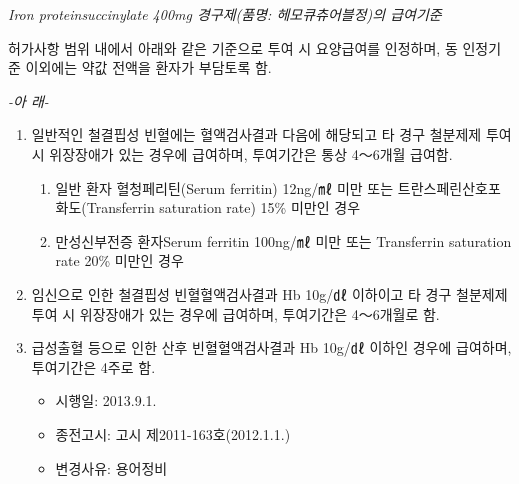 \begin{commentbox}{}
\emph{Iron proteinsuccinylate 400mg 경구제(품명: 헤모큐츄어블정)의 급여기준}\par
허가사항 범위 내에서 아래와 같은 기준으로 투여 시 요양급여를 인정하며, 동 인정기준 이외에는 약값 전액을 환자가 부담토록 함.\par
\begin{center}\emph{-아 래-}\end{center}
\begin{enumerate}[가)]\tightlist
\item 일반적인 철결핍성 빈혈에는 혈액검사결과 다음에 해당되고 타 경구 철분제제 투여 시 위장장애가 있는 경우에 급여하며, 투여기간은 통상 4～6개월 급여함.
	\begin{enumerate}[1)]\tightlist
	\item 일반 환자 혈청페리틴(Serum ferritin) 12ng/㎖ 미만 또는 트란스페린산호포화도(Transferrin saturation rate) 15\% 미만인 경우 
	\item 만성신부전증 환자Serum ferritin 100ng/㎖ 미만 또는 Transferrin saturation rate 20\% 미만인 경우 
	\end{enumerate}
\item 임신으로 인한 철결핍성 빈혈혈액검사결과 Hb 10g/㎗ 이하이고 타 경구 철분제제 투여 시 위장장애가 있는 경우에 급여하며, 투여기간은 4～6개월로 함. 
\item 급성출혈 등으로 인한 산후 빈혈혈액검사결과 Hb 10g/㎗ 이하인 경우에 급여하며, 투여기간은 4주로 함.    
	\begin{itemize}[*]\tightlist
	\item 시행일: 2013.9.1.
	\item 종전고시: 고시 제2011-163호(2012.1.1.)
	\item 변경사유: 용어정비
	\end{itemize}
\end{enumerate}
\end{commentbox}

